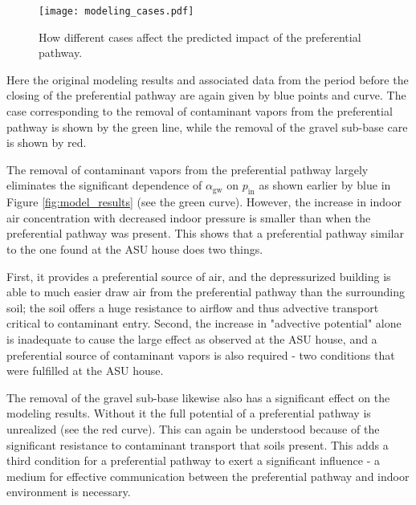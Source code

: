 \begin{figure}[htb!]
  \centering
  \texttt{[image: modeling\_cases.pdf]}
  \caption{How different cases affect the predicted impact of the preferential pathway.}
  \label{fig:model_cases}
\end{figure}

Here the original modeling results and associated data from the period before the closing of the preferential pathway are again given by blue points and curve.
The case corresponding to the removal of contaminant vapors from the preferential pathway is shown by the green line, while the removal of the gravel sub-base care is shown by red.\par

The removal of contaminant vapors from the preferential pathway largely eliminates the significant dependence of $\alpha_\mathrm{gw}$ on $p_\mathrm{in}$ as shown earlier by blue in Figure \ref{fig:model_results} (see the green curve).
However, the increase in indoor air concentration with decreased indoor pressure is smaller than when the preferential pathway was present.
This shows that a preferential pathway similar to the one found at the ASU house does two things.\par

First, it provides a preferential source of air, and the depressurized building is able to much easier draw air from the preferential pathway than the surrounding soil; the soil offers a huge resistance to airflow and thus advective transport critical to contaminant entry.
Second, the increase in "advective potential" alone is inadequate to cause the large effect as observed at the ASU house, and a preferential source of contaminant vapors is also required - two conditions that were fulfilled at the ASU house.\par

The removal of the gravel sub-base likewise also has a significant effect on the modeling results.
Without it the full potential of a preferential pathway is unrealized (see the red curve).
This can again be understood because of the significant resistance to contaminant transport that soils present.
This adds a third condition for a preferential pathway to exert a significant influence - a medium for effective communication between the preferential pathway and indoor environment is necessary.\par

